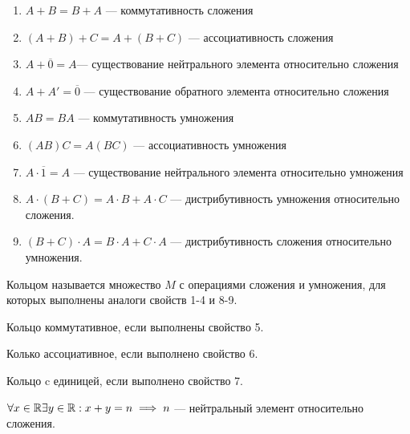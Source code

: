 \begin{enumerate}
    \item $A + B = B + A$ --- коммутативность сложения
    
    \item $(A + B) + C = A + (B + C)$ --- ассоциативность сложения
    
    \item $A + \overline{0} = A$--- существование нейтрального элемента относительно сложения
    
    \item $A + A' = \overline{0}$ --- существование обратного элемента относительно сложения
    
    \item $AB = BA$ --- коммутативность умножения
    
    \item $(AB)C = A(BC)$ --- ассоциативность умножения
    
    \item $A \cdot \overline{1} = A$ --- существование нейтрального элемента относительно умножения
    
    \item $A \cdot (B + C) = A \cdot B + A \cdot C$ --- дистрибутивность умножения относительно сложения.
    
    \item $(B + C) \cdot A = B \cdot A + C \cdot A$ --- дистрибутивность сложения относительно умножения.
\end{enumerate}

\begin{defn}
    Кольцом называется множество $M$ с операциями сложения и умножения, для которых выполнены аналоги свойств 1-4 и 8-9.
\end{defn}

\begin{defn}
    Кольцо коммутативное, если выполнены свойство 5.
\end{defn}

\begin{defn}
    Колько ассоциативное, если выполнено свойство 6.
\end{defn}

\begin{defn}
    Кольцо c единицей, если выполнено свойство 7.
\end{defn}

\begin{defn}
    $\forall x \in \mathbb{R} \exists y \in \mathbb{R}: x + y = n \implies n$ --- нейтральный элемент относительно сложения.
\end{defn}    

